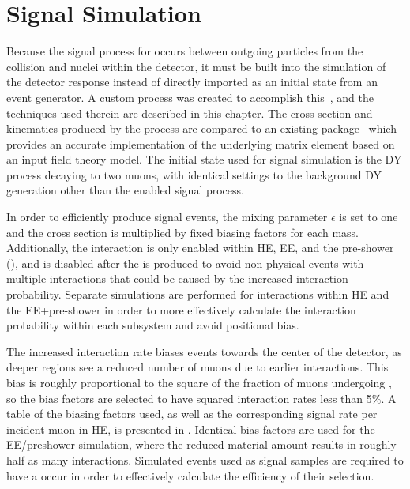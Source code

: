 \chapter{Signal Simulation}
Because the signal process for \dbrem occurs between outgoing particles from the collision and nuclei within the detector, it must be built into the \gf simulation of the detector response instead of directly imported as an initial state from an event generator. A custom process was created to accomplish this~\cite{Eichlersmith_2023}, and the techniques used therein are described in this chapter. 
The cross section and kinematics produced by the process are compared to an existing \mg package~\cite{madgraph_2014, darkgauge} which provides an accurate implementation of the underlying matrix element based on an input field theory model.
The initial state used for signal simulation is the DY process decaying to two muons, with identical settings to the background DY generation other than the enabled signal process. 

In order to efficiently produce signal events, the mixing parameter $\epsilon$ is set to one and the cross section is multiplied by fixed biasing factors for each \aprime mass. 
Additionally, the interaction is only enabled within HE, EE, and the pre-shower (), and is disabled after the \aprime is produced to avoid non-physical events with multiple \dbrem interactions that could be caused by the increased interaction probability.
Separate simulations are performed for interactions within HE and the EE+pre-shower in order to more effectively calculate the interaction probability within each subsystem and avoid positional bias.

The increased interaction rate biases events towards the center of the detector, as deeper regions see a reduced number of muons due to earlier \dbrem interactions.
This bias is roughly proportional to the square of the fraction of muons undergoing \dbrem, so the bias factors are selected to have squared interaction rates less than 5$\%$. 
A table of the biasing factors used, as well as the corresponding signal rate per incident muon in HE, is presented in .
Identical bias factors are used for the EE/preshower simulation, where the reduced material amount results in roughly half as many \dbrem interactions.
Simulated events used as signal samples are required to have a \dbrem occur in order to effectively calculate the efficiency of their selection.

